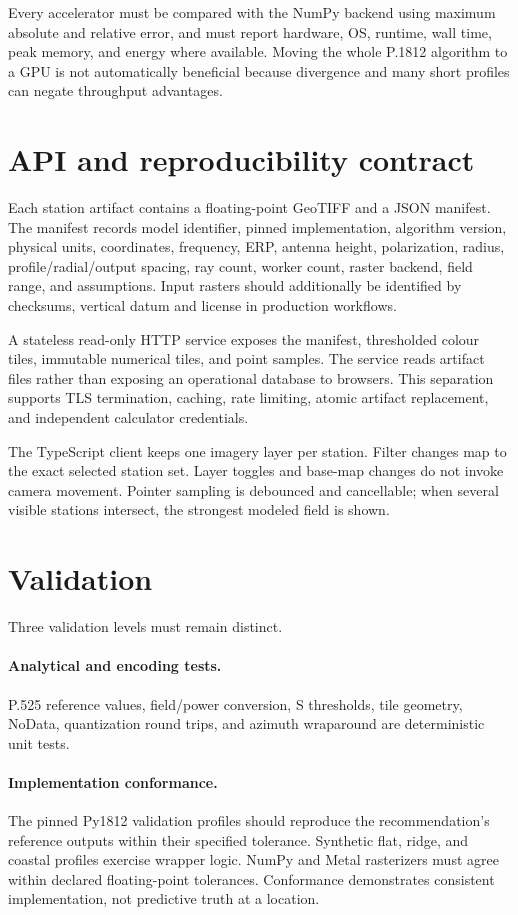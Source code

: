 \documentclass[10pt,a4paper,twocolumn]{article}
\begin{document}
Every accelerator must be compared with the NumPy backend using maximum
absolute and relative error, and must report hardware, OS, runtime, wall time,
peak memory, and energy where available. Moving the whole P.1812 algorithm to a
GPU is not automatically beneficial because divergence and many short profiles
can negate throughput advantages.

\section{API and reproducibility contract}

Each station artifact contains a floating-point GeoTIFF and a JSON manifest.
The manifest records model identifier, pinned implementation, algorithm
version, physical units, coordinates, frequency, ERP, antenna height,
polarization, radius, profile/radial/output spacing, ray count, worker count,
raster backend, field range, and assumptions. Input rasters should additionally
be identified by checksums, vertical datum and license in production workflows.

A stateless read-only HTTP service exposes the manifest, thresholded colour
tiles, immutable numerical tiles, and point samples. The service reads artifact
files rather than exposing an operational database to browsers. This separation
supports TLS termination, caching, rate limiting, atomic artifact replacement,
and independent calculator credentials.

The TypeScript client keeps one imagery layer per station. Filter changes map
to the exact selected station set. Layer toggles and base-map changes do not
invoke camera movement. Pointer sampling is debounced and cancellable; when
several visible stations intersect, the strongest modeled field is shown.

\section{Validation}

Three validation levels must remain distinct.

\paragraph{Analytical and encoding tests.}
P.525 reference values, field/power conversion, S thresholds, tile geometry,
NoData, quantization round trips, and azimuth wraparound are deterministic unit
tests.

\paragraph{Implementation conformance.}
The pinned Py1812 validation profiles should reproduce the recommendation's
reference outputs within their specified tolerance. Synthetic flat, ridge, and
coastal profiles exercise wrapper logic. NumPy and Metal rasterizers must agree
within declared floating-point tolerances. Conformance demonstrates consistent
implementation, not predictive truth at a location.
\end{document}
